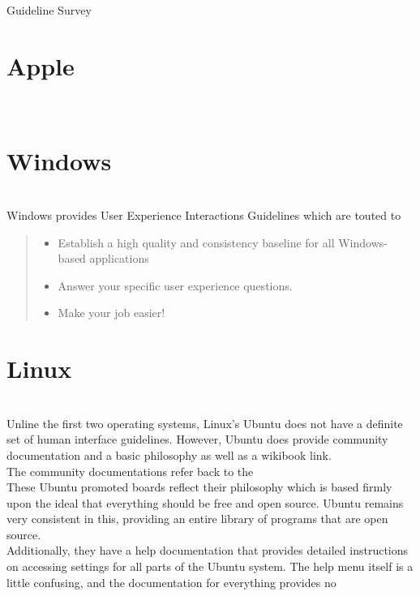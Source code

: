 
\begin{Huge}
Guideline Survey
\end{Huge}
\section*{Apple} ~\\


\section*{Windows} ~\\
Windows provides User Experience Interactions Guidelines which are touted to 
\begin{quote}
\begin{itemize}
\item Establish a high quality and consistency baseline for all Windows-based applications
\item Answer your specific user experience questions.
\item Make your job easier!
\end{itemize}


\end{quote}

\section*{Linux} ~\\
Unline the first two operating systems, Linux's Ubuntu does not have a definite set of human interface guidelines. However, Ubuntu does provide community documentation and a basic philosophy as well as a wikibook link. \\
The community documentations refer back to the \\
These Ubuntu promoted boards reflect their philosophy which is based firmly upon the ideal that everything should be free and open source.  Ubuntu remains very consistent in this, providing an entire library of programs that are open source.  \\
Additionally, they have a help documentation that provides detailed instructions on accessing settings for all parts of the Ubuntu system. The help menu itself is a little confusing, and the documentation for everything provides no 
